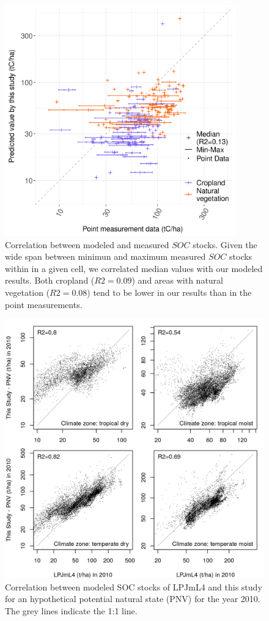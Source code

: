 \documentclass[gc, manuscript]{copernicus}
\begin{document}
\begin{figure}[h]
\includegraphics[width=10cm]{../ResultNotebooks/Output/Images/scatterComparePointData_2010.png} 
\caption{Correlation between modeled and measured $SOC$ stocks. Given the wide span between minimun and maximum measured $SOC$ stocks within in a given cell, we correlated median values with our modeled results. Both cropland ($R2=0.09$) and areas with natural vegetation ($R2=0.08$) tend to be lower in our results than in the point measurements.}
\label{fig:SOCpoint}
\end{figure}

 \begin{figure}[h]
\includegraphics[width=13cm]{../ResultNotebooks/Output/Images/scatterCompareLPJmL42010_pnv.png}
\caption{Correlation between modeled SOC stocks of LPJmL4 and this study for an hypothetical potential natural state (PNV) for the year 2010. The grey lines indicate the 1:1 line.}
\label{fig:SOCLPJmL4}
\end{figure}
\noappendix
\end{document}
